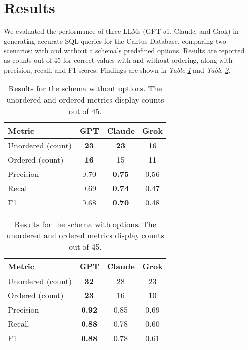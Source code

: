 \section{Results}
We evaluated the performance of three LLMs (GPT-o1, Claude, and Grok) in generating accurate SQL queries for the Cantus Database, comparing two scenarios: with and without a schema's predefined options. Results are reported as counts out of 45 for correct values with and without ordering, along with precision, recall, and F1 scores. Findings are shown in \textit{Table \ref{tab:schema_without_data}} and \textit{Table \ref{tab:schema_with_data}}.

\begin{table}[ht]
\centering
\begin{tabular}{lccc}
\hline
\textbf{Metric}             & \textbf{GPT} & \textbf{Claude} & \textbf{Grok}   \\
\hline
Unordered (count)                 & \textbf{23}  & \textbf{23}     & 16              \\
Ordered (count)                      & \textbf{16}  & 15              & 11              \\
Precision                   & 0.70        & \textbf{0.75}          & 0.56  \\
Recall                      & 0.69        & \textbf{0.74}  & 0.47           \\
F1                          & 0.68 &    \textbf{0.70}      & 0.48           \\
\hline
\end{tabular}
\caption{Results for the schema without options. The unordered and ordered metrics display counts out of 45.}
\label{tab:schema_without_data}
\end{table}

\begin{table}[ht]
\centering
\begin{tabular}{lccc}
\hline
\textbf{Metric}             & \textbf{GPT} & \textbf{Claude} & \textbf{Grok}   \\
\hline
Unordered (count)                     & \textbf{32}  & 28              & 23              \\
Ordered (count)                     & \textbf{23}  & 16              & 10              \\
Precision                   & \textbf{0.92}       & 0.85          & 0.69  \\
Recall                      & \textbf{0.88} & 0.78          & 0.60           \\
F1                          & \textbf{0.88} & 0.78          & 0.61           \\
\hline
\end{tabular}
\caption{Results for the schema with options. The unordered and ordered metrics display counts out of 45.}
\label{tab:schema_with_data}
\end{table}